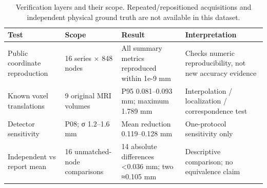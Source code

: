 \begin{table}
\caption{Verification layers and their scope. Repeated/repositioned acquisitions and independent physical ground truth are not available in this dataset.}
\centering
\begin{tabular}{llll}
\hline
Test & Scope & Result & Interpretation \\
\hline
Public coordinate reproduction & 16 series × 848 nodes & All summary metrics reproduced within 1e-9 mm & Checks numeric reproducibility, not new accuracy evidence \\
Known voxel translations & 9 original MRI volumes & P95 0.081–0.093 mm; maximum 1.789 mm & Interpolation / localization / correspondence test \\
Detector sensitivity & P08; σ 1.2–1.6 mm & Mean reduction 0.119–0.128 mm & One-protocol sensitivity only \\
Independent vs report mean & 16 unmatched-node comparisons & 14 absolute differences <0.036 mm; two ≈0.105 mm & Descriptive comparison; no equivalence claim \\
\hline
\end{tabular}
\end{table}
